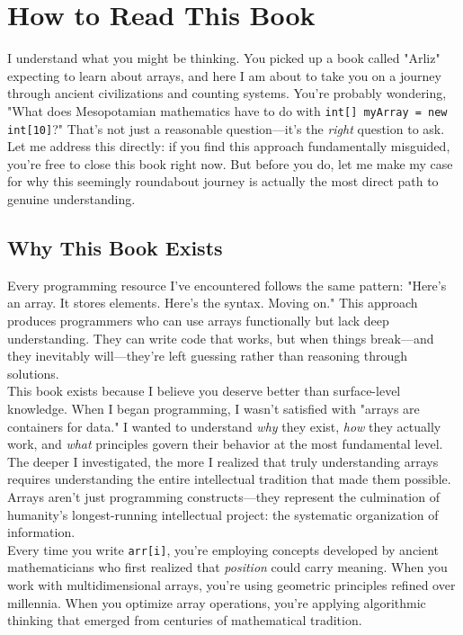 \chapter*{How to Read This Book}

I understand what you might be thinking. You picked up a book called "Arliz" expecting to learn about arrays, and here I am about to take you on a journey through ancient civilizations and counting systems. You're probably wondering, "What does Mesopotamian mathematics have to do with \texttt{int[] myArray = new int[10]}?" That's not just a reasonable question—it's the \emph{right} question to ask.\\

Let me address this directly: if you find this approach fundamentally misguided, you're free to close this book right now. But before you do, let me make my case for why this seemingly roundabout journey is actually the most direct path to genuine understanding.\\

\section*{Why This Book Exists}

Every programming resource I've encountered follows the same pattern: "Here's an array. It stores elements. Here's the syntax. Moving on." This approach produces programmers who can use arrays functionally but lack deep understanding. They can write code that works, but when things break—and they inevitably will—they're left guessing rather than reasoning through solutions.\\

This book exists because I believe you deserve better than surface-level knowledge. When I began programming, I wasn't satisfied with "arrays are containers for data." I wanted to understand \emph{why} they exist, \emph{how} they actually work, and \emph{what} principles govern their behavior at the most fundamental level.\\

The deeper I investigated, the more I realized that truly understanding arrays requires understanding the entire intellectual tradition that made them possible. Arrays aren't just programming constructs—they represent the culmination of humanity's longest-running intellectual project: the systematic organization of information.\\

Every time you write \texttt{arr[i]}, you're employing concepts developed by ancient mathematicians who first realized that \emph{position} could carry meaning. When you work with multidimensional arrays, you're using geometric principles refined over millennia. When you optimize array operations, you're applying algorithmic thinking that emerged from centuries of mathematical tradition.\\

